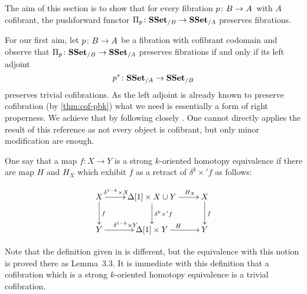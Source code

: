 \documentclass[reqno,10pt,a4paper,oneside,draft]{amsart}
\begin{document}
The  aim of this section is to show that for every fibration $p \colon B \to A$~with $A$ cofibrant, the pushforward functor $\Pi_p \colon \mathbf{SSet}_{/B} \to \mathbf{SSet}_{/A}$ 
preserves fibrations. 
\medskip

For our first aim, let $p \colon B \to A$ be a fibration with cofibrant codomain and observe that 
$\Pi_p \colon \mathbf{SSet}_{/B} \to \mathbf{SSet}_{/A}$  preserves fibrations if and only if its left adjoint 
\[
p^* \colon \mathbf{SSet}_{/A} \to \mathbf{SSet}_{/B}
\]
preserves trivial cofibrations. As the left adjoint is already known to preserve cofibration (by \cref{thm:cof-pbk}) what we need is essentially a form of right properness. We achieve that by following closely \cite[Section~3]{gambino2017frobenius}. One cannot directly applies the result of this reference as not every object is cofibrant, but only minor modification are enough.




\begin{definition}
One say that a map $f :X \rightarrow Y$ is a strong $k$-oriented homotopy equivalence if there are map $H$ and $H_X$ which exhibit $f$ as a retract of $\delta^k \times ' f$ as follows:

\[\xymatrix{X \ar[d]^{f} \ar[r]^{\hspace{-0.8cm}\delta^{1-k} \times X} & \Delta[1] \times X \cup Y \ar[d]^{\delta^k \times' f} \ar[r]^{\hspace{1cm}H_X} & X \ar[d]^{f} \\
Y \ar[r]^{\delta^{1-k} \times Y} & \Delta[1] \times Y \ar[r]^{H} & Y 
}\]


\end{definition}

Note that the definition given in \cite{gambino2017frobenius} is different, but the equivalence with this notion is proved there as Lemma~3.3. It is immediate with this definition that a cofibration which is a strong $k$-oriented homotopy equivalence is a trivial cofibration.
\end{document}

